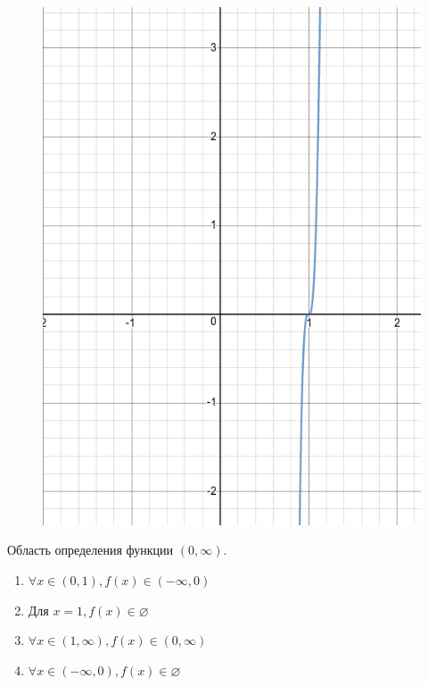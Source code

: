 \documentclass[a4paper,10pt]{article}
\begin{document}
		\begin{figure}[h!]
			\includegraphics[scale=0.2]{./images/logExpr.png}
		\end{figure}
		Область определения функции $(0, \infty)$. 
		\begin{enumerate}
			\item $\forall x \in (0, 1), f(x) \in (-\infty, 0)$
			\item $\text{Для } x = 1, f(x) \in \varnothing$
			\item $\forall x \in (1, \infty), f(x) \in (0, \infty)$
			\item $\forall x \in (-\infty, 0), f(x) \in \varnothing$
		\end{enumerate}
\end{document}
